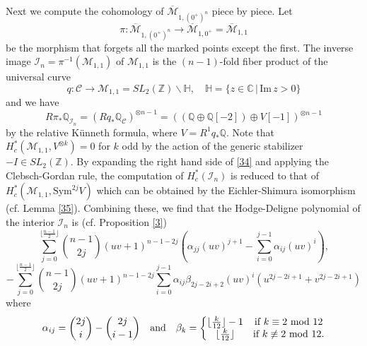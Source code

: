 \documentclass[11pt]{amsart}
\numberwithin{equation}{section}
\theoremstyle{definition}
\newcommand{\CC}{\mathbb{C}}
\newcommand{\QQ}{\mathbb{Q}}
\newcommand{\ZZ}{\mathbb{Z}}
\newcommand{\HH}{\mathbb{H}}
\def\cC{{\mathcal C}}
\def\cM{{\mathcal M}}
\def\cI{{\mathcal I}}
\def\and{\quad{\rm and}\quad}
\def\lra{\longrightarrow }
\def\beq{\begin{equation}}
\def\eeq{\end{equation}}
\def\bcM{\overline{\cM}}
\begin{document}
Next we compute the cohomology of $\bcM_{1,(0^+)^n}$ piece by piece. 
Let $$\pi:\bcM_{1,(0^+)^n}\lra \bcM_{1,0^+}=\bcM_{1,1}$$
be the morphism that forgets all the marked points except the first. The inverse image $\cI_n=\pi^{-1}(\cM_{1,1})$ of $\cM_{1,1}$ is the $(n-1)$-fold fiber product of the universal curve $$q:\cC\lra \cM_{1,1}=SL_2(\ZZ)\backslash \HH, \quad \HH=\{z\in \CC\,|\, \mathrm{Im}\, z>0\}$$ and we have
\beq\label{34} R\pi_*\QQ_{\cI_n}=(Rq_*\QQ_\cC)^{\otimes n-1}=\left((\QQ\oplus \QQ[-2])\oplus V[-1]\right)^{\otimes n-1}\eeq
by the relative K\"unneth formula, where $V=R^1q_*\QQ$.
Note that $H^*_c(\cM_{1,1},V^{\otimes k})=0$ for $k$ odd by the action of the generic stabilizer $-I\in SL_2(\ZZ)$.  
By expanding the right hand side of \eqref{34} and applying the Clebsch-Gordan rule, the computation of $H^*_c(\cI_n)$ is reduced to that of $H^*_c(\cM_{1,1}, \mathrm{Sym}^{2j}V)$ which can be obtained by the Eichler-Shimura isomorphism (cf. Lemma \ref{35}). 
Combining these, we find that the Hodge-Deligne polynomial of the interior $\cI_n$ is (cf. Proposition \ref{3})
\beq\label{36}
\sum_{j=0}^{\lfloor\frac{n-1}{2}\rfloor} \binom{n-1}{2j} (uv+1)^{n-1-2j} \left( \alpha_{jj}(uv)^{j+1} - \sum_{i=0}^{j-1} \alpha_{ij}(uv)^i\right),
\eeq
\[-\sum_{j=0}^{\lfloor\frac{n-1}{2}\rfloor} \binom{n-1}{2j} (uv+1)^{n-1-2j}  \sum_{i=0}^{j-1} \alpha_{ij}\beta_{2j-2i+2}(uv)^i(u^{2j-2i+1}+v^{2j-2i+1})  \]
where \[ \alpha_{ij}=\binom{2j}{i}-\binom{2j}{i-1}
\and 
\beta_k=\left\{\begin{matrix}  \lfloor \frac{k}{12}\rfloor -1 & \text{if } k\equiv 2 \text{ mod } 12\\
\lfloor \frac{k}{12}\rfloor & \text{if } k\not\equiv 2 \text{ mod } 12.\end{matrix}\right.
\]
\end{document}

